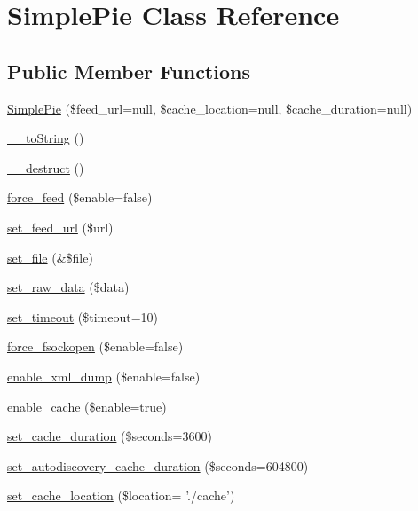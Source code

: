 \hypertarget{class_simple_pie}{\section{Simple\-Pie Class Reference}
\label{class_simple_pie}
}
\subsection*{Public Member Functions}
\begin{DoxyCompactItemize}
\item 
\hyperlink{class_simple_pie_aa4562e49412a8c5579e52e9524b2f091}{Simple\-Pie} (\$feed\-\_\-url=null, \$cache\-\_\-location=null, \$cache\-\_\-duration=null)
\item 
\hyperlink{class_simple_pie_ae70a434011a61eef55a6537dcc91d81f}{\-\_\-\-\_\-to\-String} ()
\item 
\hyperlink{class_simple_pie_a1670ebcc5e2904646b92c2d7284c589a}{\-\_\-\-\_\-destruct} ()
\item 
\hyperlink{class_simple_pie_adf19ffbec7161f760ed7a37af83673da}{force\-\_\-feed} (\$enable=false)
\item 
\hyperlink{class_simple_pie_a6796f3a31160065b0a0826984d097eed}{set\-\_\-feed\-\_\-url} (\$url)
\item 
\hyperlink{class_simple_pie_a5abe857e606107f3f9daff3703c4148e}{set\-\_\-file} (\&\$file)
\item 
\hyperlink{class_simple_pie_afb7a6efd3fee2736f1eb18a991ad103e}{set\-\_\-raw\-\_\-data} (\$data)
\item 
\hyperlink{class_simple_pie_add947538b8dfd67cb7a17508c0bb076a}{set\-\_\-timeout} (\$timeout=10)
\item 
\hyperlink{class_simple_pie_a596f494fa627d926b0d9291bff010b4f}{force\-\_\-fsockopen} (\$enable=false)
\item 
\hyperlink{class_simple_pie_a52f89f7cc5ab0350129e20b9996c9f73}{enable\-\_\-xml\-\_\-dump} (\$enable=false)
\item 
\hyperlink{class_simple_pie_aebbd70de7a25e59e2184078f50fed0d2}{enable\-\_\-cache} (\$enable=true)
\item 
\hyperlink{class_simple_pie_aa6a7cda1c75d8c0cd987755af3038eb8}{set\-\_\-cache\-\_\-duration} (\$seconds=3600)
\item 
\hyperlink{class_simple_pie_a789086d2c6c9ec6583e7b4b54433bd96}{set\-\_\-autodiscovery\-\_\-cache\-\_\-duration} (\$seconds=604800)
\item 
\hyperlink{class_simple_pie_ad2e367aa60fb0388f8f358a9445d3db4}{set\-\_\-cache\-\_\-location} (\$location= './cache')

\end{DoxyCompactItemize}
